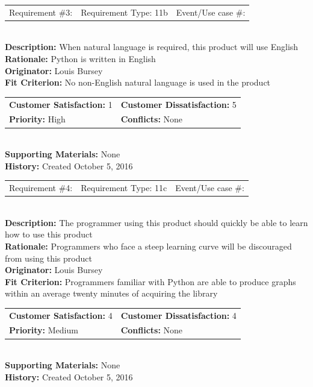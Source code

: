 \documentclass[12pt, titlepage]{article}
\begin{document}
%
%
\begin{reqbox}
\begin{tabular}{ccc}
Requirement \#3: & Requirement Type: 11b & Event/Use case \#: \\
\end{tabular} \\
\textbf{Description:} When natural language is required, this product will use English \\
\textbf{Rationale:} Python is written in English \\
\textbf{Originator:} Louis Bursey\\
\textbf{Fit Criterion:}  No non-English natural language is used in the product \\
\begin{tabular}{ll}
\textbf{Customer Satisfaction:} 1 & \textbf{Customer Dissatisfaction:} 5 \\
\textbf{Priority:} High & \textbf{Conflicts:} None\\
\end{tabular} \\
\textbf{Supporting Materials:} None \\
\textbf{History:} Created October 5, 2016
\end{reqbox}
%
%
%
%
\begin{reqbox}
\begin{tabular}{ccc}
Requirement \#4: & Requirement Type: 11c & Event/Use case \#: \\
\end{tabular} \\
\textbf{Description:} The programmer using this product should quickly be able to learn how to use this product \\
\textbf{Rationale:} Programmers who face a steep learning curve will be discouraged from using this product \\
\textbf{Originator:} Louis Bursey\\
\textbf{Fit Criterion:}  Programmers familiar with Python are able to produce graphs within an average twenty minutes of acquiring the library \\
\begin{tabular}{ll}
\textbf{Customer Satisfaction:} 4 & \textbf{Customer Dissatisfaction:} 4 \\
\textbf{Priority:} Medium & \textbf{Conflicts:} None\\
\end{tabular} \\
\textbf{Supporting Materials:} None \\
\textbf{History:} Created October 5, 2016
\end{reqbox}
\end{document}
